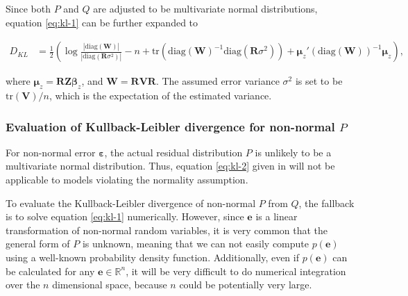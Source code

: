 \documentclass[]{interact}
\theoremstyle{plain}%
\theoremstyle{definition}
\theoremstyle{remark}
\begin{document}
Since both \(P\) and \(Q\) are adjusted to be multivariate normal
distributions, equation \ref{eq:kl-1} can be further expanded to

\begin{align}
\label{eq:kl-2}
D_{KL} &= \frac{1}{2}\left(\log\frac{|\text{diag}(\boldsymbol{W})|}{|\text{diag}(\boldsymbol{R}\sigma^2)|} - n + \text{tr}(\text{diag}(\boldsymbol{W})^{-1}\text{diag}(\boldsymbol{R}\sigma^2)) + \boldsymbol{\mu}_z'(\text{diag}(\boldsymbol{W}))^{-1}\boldsymbol{\mu}_z\right),
\end{align}

\noindent where
\(\boldsymbol{\mu}_z = \boldsymbol{R}\boldsymbol{Z}\boldsymbol{\beta}_z\),
and \(\boldsymbol{W} = \boldsymbol{R}\boldsymbol{V}\boldsymbol{R}\). The
assumed error variance \(\sigma^2\) is set to be
\(\text{tr}(\boldsymbol{V})/n\), which is the expectation of the
estimated variance.

\subsubsection{\texorpdfstring{Evaluation of Kullback-Leibler divergence
for non-normal
\(P\)}{Evaluation of Kullback-Leibler divergence for non-normal P}}\label{evaluation-of-kullback-leibler-divergence-for-non-normal-p}

For non-normal error \(\boldsymbol{\varepsilon}\), the actual residual
distribution \(P\) is unlikely to be a multivariate normal distribution.
Thus, equation \ref{eq:kl-2} given in \citet{li2023plot} will not be
applicable to models violating the normality assumption.

To evaluate the Kullback-Leibler divergence of non-normal \(P\) from
\(Q\), the fallback is to solve equation \ref{eq:kl-1} numerically.
However, since \(\boldsymbol{e}\) is a linear transformation of
non-normal random variables, it is very common that the general form of
\(P\) is unknown, meaning that we can not easily compute
\(p(\boldsymbol{e})\) using a well-known probability density function.
Additionally, even if \(p(\boldsymbol{e})\) can be calculated for any
\(\boldsymbol{e} \in \mathbb{R}^n\), it will be very difficult to do
numerical integration over the \(n\) dimensional space, because \(n\)
could be potentially very large.
\end{document}

